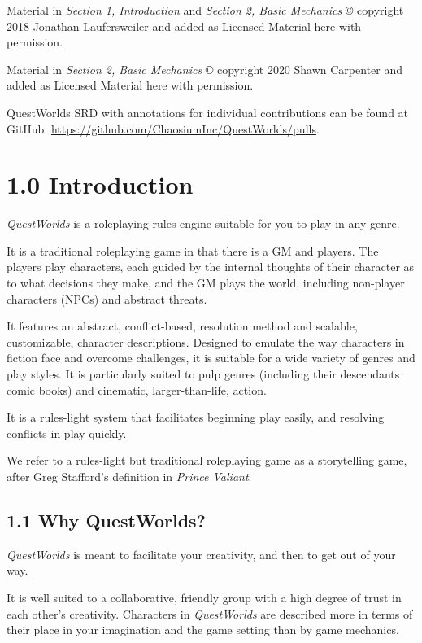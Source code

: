 \documentclass[
  11pt,
]{article}
\begin{document}
Material in \emph{Section 1, Introduction} and \emph{Section 2, Basic
Mechanics} © copyright 2018 Jonathan Laufersweiler and added as Licensed
Material here with permission.

Material in \emph{Section 2, Basic Mechanics} © copyright 2020 Shawn
Carpenter and added as Licensed Material here with permission.

QuestWorlds SRD with annotations for individual contributions can be
found at GitHub: \url{https://github.com/ChaosiumInc/QuestWorlds/pulls}.

\hypertarget{introduction}{%
\section{1.0 Introduction}\label{introduction}}

\emph{QuestWorlds} is a roleplaying rules engine suitable for you to
play in any genre.

It is a traditional roleplaying game in that there is a GM and players.
The players play characters, each guided by the internal thoughts of
their character as to what decisions they make, and the GM plays the
world, including non-player characters (NPCs) and abstract threats.

It features an abstract, conflict-based, resolution method and scalable,
customizable, character descriptions. Designed to emulate the way
characters in fiction face and overcome challenges, it is suitable for a
wide variety of genres and play styles. It is particularly suited to
pulp genres (including their descendants comic books) and cinematic,
larger-than-life, action.

It is a rules-light system that facilitates beginning play easily, and
resolving conflicts in play quickly.

We refer to a rules-light but traditional roleplaying game as a
storytelling game, after Greg Stafford's definition in \emph{Prince
Valiant}.

\hypertarget{why-questworlds}{%
\subsection{1.1 Why QuestWorlds?}\label{why-questworlds}}

\emph{QuestWorlds} is meant to facilitate your creativity, and then to
get out of your way.

It is well suited to a collaborative, friendly group with a high degree
of trust in each other's creativity. Characters in \emph{QuestWorlds}
are described more in terms of their place in your imagination and the
game setting than by game mechanics.
\end{document}
